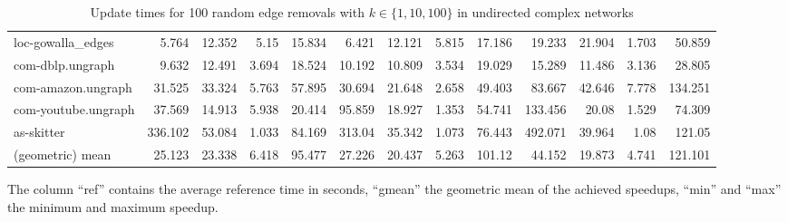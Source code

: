 \begin{landscape}
\begin{table}[h!]
\begin{tabular}{l|rrrr|rrrr|rrrr}
 loc-gowalla\_edges    &   5.764 &  12.352 &  5.15  &  15.834 &   6.421 &  12.121 &  5.815 &  17.186 &  19.233 &  21.904 &  1.703 &  50.859 \\
 com-dblp.ungraph     &   9.632 &  12.491 &  3.694 &  18.524 &  10.192 &  10.809 &  3.534 &  19.029 &  15.289 &  11.486 &  3.136 &  28.805 \\
 com-amazon.ungraph   &  31.525 &  33.324 &  5.763 &  57.895 &  30.694 &  21.648 &  2.658 &  49.403 &  83.667 &  42.646 &  7.778 & 134.251 \\
 com-youtube.ungraph  &  37.569 &  14.913 &  5.938 &  20.414 &  95.859 &  18.927 &  1.353 &  54.741 & 133.456 &  20.08  &  1.529 &  74.309 \\
 as-skitter           & 336.102 &  53.084 &  1.033 &  84.169 & 313.04  &  35.342 &  1.073 &  76.443 & 492.071 &  39.964 &  1.08  & 121.05  \\ \midrule \midrule
 (geometric) mean     &  25.123 &  23.338 &  6.418 &  95.477 &  27.226 &  20.437 &  5.263 & 101.12  &  44.152 &  19.873 &  4.741 & 121.101 \\
\bottomrule
\end{tabular}
\caption{Update times for 100 random edge removals with  $k \in \{1, 10, 100\}$ in undirected complex networks}{The column ``ref'' contains the average reference time in seconds, ``gmean'' the geometric mean of the achieved speedups, ``min'' and ``max'' the minimum and maximum speedup.}
\label{tbl:removalsUndirectedComplex}
\end{table}

\end{landscape}


